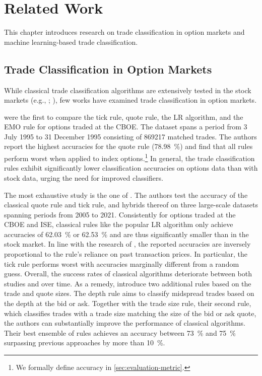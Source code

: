 \section{Related Work}\label{sec:related-work}

This chapter introduces research on trade classification in option markets and machine learning-based trade classification.

\subsection{Trade Classification in Option Markets}
\label{sec:trade-classification-in-option-markets}

While classical trade classification algorithms are extensively tested in the stock markets (e.g., \textcite[][3806--3821]{chakrabartyTradeClassificationAlgorithms2007}; \textcite[][259--286]{odders-whiteOccurrenceConsequencesInaccurate2000}), few works have examined trade classification in option markets.

\textcite[][883--887]{savickasInferringDirectionOption2003} were the first to compare the tick rule, quote rule, the \gls{LR} algorithm, and the \gls{EMO} rule for options traded at the \gls{CBOE}. The dataset spans a period from 3 July 1995 to 31 December 1995 consisting of \num{869217} matched trades. The authors report the highest accuracies for the quote rule (\SI{78.98}{\percent}) and find that all rules perform worst when applied to index options.\footnote{We formally define accuracy in \cref{sec:evaluation-metric}.} In general, the trade classification rules exhibit significantly lower classification accuracies on options data than with stock data, urging the need for improved classifiers.

The most exhaustive study is the one of \textcite[][1--53]{grauerOptionTradeClassification2022}. The authors test the accuracy of the classical quote rule and tick rule, and hybrids thereof on three large-scale datasets spanning periods from 2005 to 2021. Consistently for options traded at the \gls{CBOE} and \gls{ISE}, classical rules like the popular \gls{LR}  algorithm only achieve accuracies of \SI{62.03}{\percent} or \SI{62.53}{\percent} and are thus significantly smaller than in the stock market. In line with the research of \textcite[][886]{savickasInferringDirectionOption2003}, the reported accuracies are inversely proportional to the rule's reliance on past transaction prices. In particular, the tick rule performs worst with accuracies marginally different from a random guess. Overall, the success rates of classical algorithms deteriorate between both studies and over time. As a remedy, \textcite[][13--15]{grauerOptionTradeClassification2022} introduce two additional rules based on the trade and quote sizes. The depth rule aims to classify midspread trades based on the depth at the bid or ask. Together with the trade size rule, their second rule, which classifies trades with a trade size matching the size of the bid or ask quote, the authors can substantially improve the performance of classical algorithms. Their best ensemble of rules achieves an accuracy between \SI{73}{\percent} and \SI{75}{\percent} surpassing previous approaches by more than \SI{10}{\percent}.

